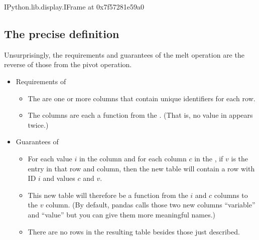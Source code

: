 \documentclass[letterpaper,10pt,english]{jupyterBook}
\begin{document}
\begin{sphinxVerbatim}[commandchars=\\\{\}]
\PYGZlt{}IPython.lib.display.IFrame at 0x7f57281e59a0\PYGZgt{}
\end{sphinxVerbatim}


\subsection{The precise definition}
\label{\detokenize{chapter-6-single-table-verbs:id1}}
\sphinxAtStartPar
Unsurprisingly, the requirements and guarantees of the melt operation are the reverse of those from the pivot operation.
\begin{itemize}
\item {} 
\sphinxAtStartPar
Requirements of 
\begin{itemize}
\item {} 
\sphinxAtStartPar
The  are one or more columns that contain unique identifiers for each row.

\item {} 
\sphinxAtStartPar
The  columns are each a function from the .  (That is, no value in  appears twice.)

\end{itemize}

\item {} 
\sphinxAtStartPar
Guarantees of 
\begin{itemize}
\item {} 
\sphinxAtStartPar
For each value \(i\) in the  column and for each column \(c\) in the , if \(v\) is the entry in that row and column, then the new table will contain a row with ID \(i\) and values \(c\) and \(v\).

\item {} 
\sphinxAtStartPar
This new table will therefore be a function from the \(i\) and \(c\) columns to the \(v\) column.  (By default, pandas calls those two new columns “variable” and “value” but you can give them more meaningful names.)

\item {} 
\sphinxAtStartPar
There are no rows in the resulting table besides those just described.

\end{itemize}

\end{itemize}
\end{document}
